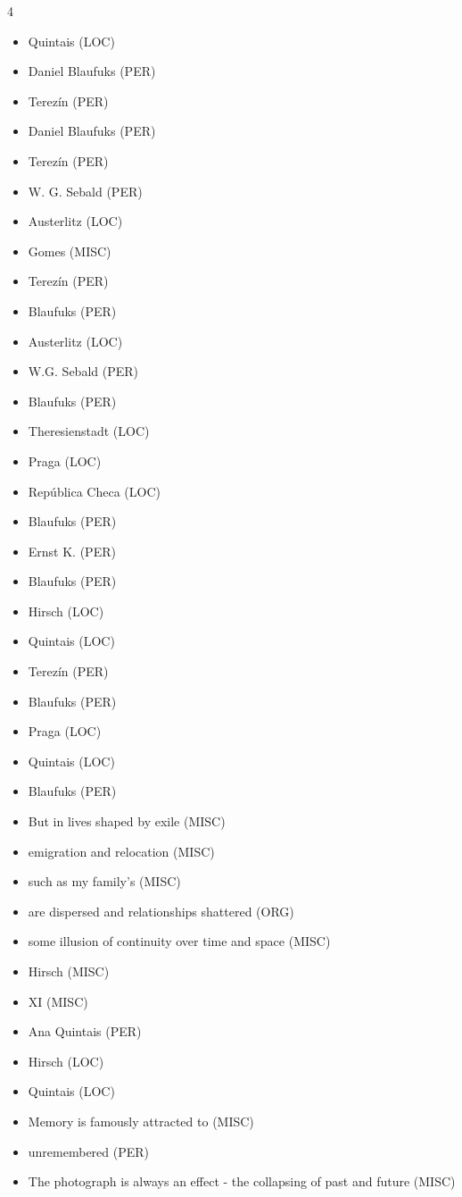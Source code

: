 \documentclass{article}
\begin{document}
\begin{multicols}{4}
\begin{itemize}
\item Quintais (LOC)
\item Daniel Blaufuks (PER)
\item Terezín (PER)
\item Daniel Blaufuks (PER)
\item Terezín (PER)
\item W. G. 
Sebald (PER)
\item Austerlitz (LOC)
\item Gomes (MISC)
\item Terezín (PER)
\item Blaufuks (PER)
\item Austerlitz (LOC)
\item W.G. Sebald (PER)
\item Blaufuks (PER)
\item Theresienstadt (LOC)
\item Praga (LOC)
\item República  Checa (LOC)
\item Blaufuks (PER)
\item Ernst  K. (PER)
\item Blaufuks (PER)
\item Hirsch (LOC)
\item Quintais (LOC)
\item Terezín (PER)
\item Blaufuks (PER)
\item Praga (LOC)
\item Quintais (LOC)
\item Blaufuks (PER)
\item But in lives shaped by exile (MISC)
\item emigration and relocation (MISC)
\item such as my family's (MISC)
\item are dispersed and relationships shattered (ORG)
\item some illusion of continuity over time and space (MISC)
\item Hirsch (MISC)
\item XI (MISC)
\item Ana Quintais (PER)
\item Hirsch (LOC)
\item Quintais (LOC)
\item Memory is famously attracted to (MISC)
\item unremembered (PER)
\item The photograph is always an effect - the collapsing of past and future (MISC)

\end{itemize}
\end{multicols}
\end{document}
